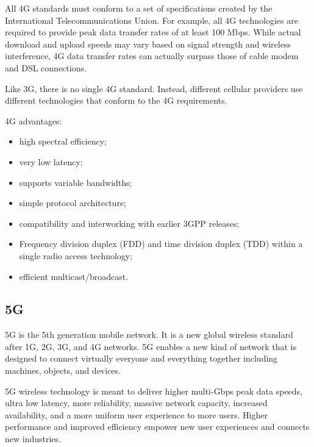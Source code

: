 All 4G standards must conform to a set of specifications created by the International Telecommunications Union. For example, all 4G technologies are required to provide peak data transfer rates of at least 100 Mbps. While actual download and upload speeds may vary based on signal strength and wireless interference, 4G data transfer rates can actually surpass those of cable modem and DSL connections.

Like 3G, there is no single 4G standard. Instead, different cellular providers use different technologies that conform to the 4G requirements.

4G advantages:
\begin{itemize}
	\item high spectral efficiency;
	\item very low latency;
	\item supports variable bandwidths;
	\item simple protocol architecture;
	\item compatibility and interworking with earlier 3GPP releases;
	\item Frequency division duplex (FDD) and time division duplex (TDD) within a single radio access technology;
	\item efficient multicast/broadcast.
\end{itemize}


	\subsection{5G}
	
%
%

5G is the 5th generation mobile network. It is a new global wireless standard after 1G, 2G, 3G, and 4G networks. 5G enables a new kind of network that is designed to connect virtually everyone and everything together including machines, objects, and devices.

5G wireless technology is meant to deliver higher multi-Gbps peak data speeds, ultra low latency, more reliability, massive network capacity, increased availability, and a more uniform user experience to more users. Higher performance and improved efficiency empower new user experiences and connects new industries.

